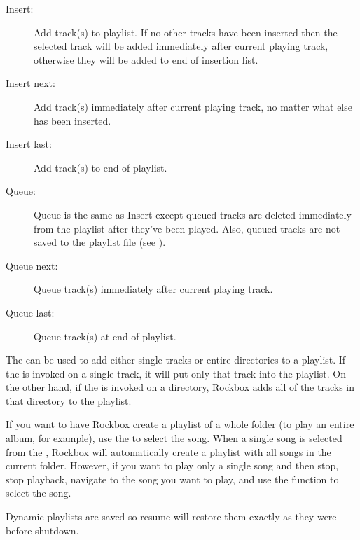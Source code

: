 \begin{description}
\item [Insert:]
  Add track(s) to playlist. If no other tracks have been inserted then the
  selected track will be added immediately after current playing track,
  otherwise they will be added to end of insertion list.
\item [Insert next:] 
  Add track(s) immediately after current playing track, no matter what else has
  been inserted.
\item [Insert last:]
  Add track(s) to end of playlist.
\item [Queue:]
  Queue is the same as Insert except queued tracks are deleted immediately from
  the playlist after they've been played. Also, queued tracks are not saved to
  the playlist file (see ).
\item [Queue next:]
  Queue track(s) immediately after current playing track.
\item [Queue last:]
  Queue track(s) at end of playlist.
\end{description}

The  can be used to add either single tracks or 
entire directories to a playlist. If the  is 
invoked on a single track, it will put only that track into the playlist.  
On the other hand, if the  is invoked on a 
directory, Rockbox adds all of the tracks in that directory to the playlist.  


If you want to have Rockbox create a playlist of a whole folder (to play an entire 
album, for example), use the  to select the song. When a single 
song is selected from the , Rockbox will automatically create a 
playlist with all songs in the current folder. However, if you want to play only a single 
song and then stop, stop playback, navigate to the song you want to play, and use the 
 function to select the song.

Dynamic playlists are saved so resume will restore them exactly as they were before
shutdown.

